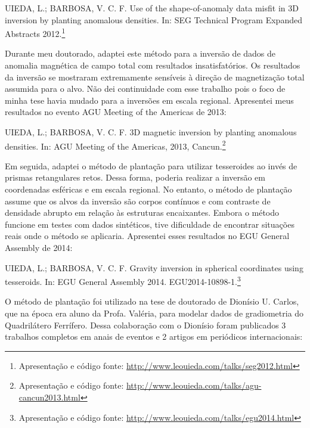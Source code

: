 \begin{displayquote}
    UIEDA, L.; BARBOSA, V. C. F. Use of the shape-of-anomaly data
    misfit in 3D inversion by planting anomalous densities. In: SEG Technical
    Program Expanded Abstracts 2012.\footnote{Apresentação e código fonte:
    \url{http://www.leouieda.com/talks/seg2012.html}}
\end{displayquote}


Durante meu doutorado, adaptei este método para a inversão de dados de anomalia
magnética de campo total com resultados insatisfatórios.
Os resultados da inversão se mostraram extremamente sensíveis à direção de
magnetização total assumida para o alvo.
Não dei continuidade com esse trabalho pois o foco de minha tese havia mudado
para a inversões em escala regional.
Apresentei meus resultados no evento AGU Meeting of the Americas de 2013:

\begin{displayquote}
    UIEDA, L.; BARBOSA, V. C. F. 3D magnetic inversion by planting anomalous
    densities. In: AGU Meeting of the Americas, 2013,
    Cancun.\footnote{Apresentação e código fonte:
    \url{http://www.leouieda.com/talks/agu-cancun2013.html}}
\end{displayquote}

Em seguida, adaptei o método de plantação para utilizar tesseroides ao invés de
prismas retangulares retos.
Dessa forma, poderia realizar a inversão em coordenadas esféricas e em escala
regional.
No entanto, o método de plantação assume que os alvos da inversão são corpos
contínuos e com contraste de densidade abrupto em relação às estruturas
encaixantes.
Embora o método funcione em testes com dados sintéticos,
tive dificuldade de encontrar situações reais onde o método se aplicaria.
Apresentei esses resultados no EGU General Assembly de 2014:

\begin{displayquote}
    UIEDA, L.; BARBOSA, V. C. F. Gravity inversion in spherical
    coordinates using tesseroids. In: EGU General Assembly 2014.
    EGU2014-10898-1.\footnote{Apresentação e código fonte:
    \url{http://www.leouieda.com/talks/egu2014.html}}
\end{displayquote}


O método de plantação foi utilizado na tese de doutorado de Dionísio U. Carlos,
que na época era aluno da Profa. Valéria, para modelar dados de gradiometria do
Quadrilátero Ferrífero.
Dessa colaboração com o Dionísio foram publicados 3 trabalhos completos em
anais de eventos e 2 artigos em periódicos internacionais:

